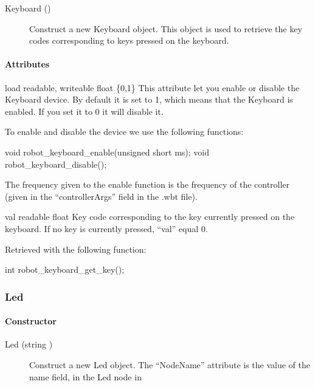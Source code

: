 \noindent
\begin{description}
\item[{Keyboard ()}] Construct a new Keyboard object. This object is
  used to retrieve the key codes corresponding to keys pressed on the
  keyboard.
\end{description}

\paragraph{Attributes}

\noindent
\begin{itemize}
\begin{attribute}{load}
  {readable, writeable}
  {float}
  {\{0,1\}}
  This attribute let you enable or disable the Keyboard
  device.  By default it is set to 1, which means that the Keyboard is
  enabled. If you set it to 0 it will disable it.


  To enable and disable the device we use the following \webots functions:
\begin{cxx}
void robot_keyboard_enable(unsigned short ms);
void robot_keyboard_disable();
\end{cxx}

The frequency given to the enable function is the frequency of the
\urbi controller (given in the ``controllerArgs'' field in the .wbt
file).
\end{attribute}

\begin{attribute}{val}
  {readable}
  {float}
  {}
  Key code corresponding to the key currently pressed on
  the keyboard. If no key is currently pressed, ``val'' equal 0.

  Retrieved with the following \webots function:
\begin{cxx}
int robot_keyboard_get_key();
\end{cxx}
\end{attribute}
\end{itemize}

\subsubsection{Led}

\paragraph{Constructor}

\begin{description}
\item[{Led (string )}] Construct a new Led object. The
  ``NodeName'' attribute is the value of the name field, in the Led
  node in \webots
\end{description}


